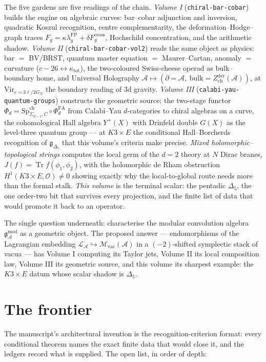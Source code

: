 \documentclass[11pt]{article}
\providecommand{\cA}{\mathcal{A}}
\providecommand{\cL}{\mathcal{L}}
\providecommand{\cM}{\mathcal{M}}
\providecommand{\cO}{\mathcal{O}}
\providecommand{\fg}{\mathfrak{g}}
\providecommand{\Vir}{\mathrm{Vir}}
\providecommand{\Zder}{Z^{\mathrm{der}}_{\mathrm{ch}}}
\providecommand{\PhiFA}{\Phi^{\mathrm{FA}}}
\providecommand{\SpCh}{\mathrm{Sp}^{\mathrm{ch}}}
\providecommand{\Dfive}{\Delta_5}
\providecommand{\Tr}{\operatorname{Tr}}
\begin{document}
The five gardens are five readings of the chain. \emph{Volume I}
(\texttt{chiral-bar-cobar}) builds the engine on algebraic curves:
bar--cobar adjunction and inversion, quadratic Koszul recognition,
centre complementarity, the deformation--Hodge--graph traces
$F_g=\kappa\lambda_g^{\mathrm{FP}}+\delta F_g^{\mathrm{cross}}$,
Hochschild concentration, and the arithmetic shadow. \emph{Volume II}
(\texttt{chiral-bar-cobar-vol2}) reads the same object as physics:
bar $=$ BV/BRST, quantum master equation $=$ Maurer--Cartan, anomaly
$=$ curvature ($c-26\leftrightarrow\kappa_{\mathrm{tot}}$), the
two-coloured Swiss-cheese operad as bulk--boundary home, and
Universal Holography $\cA\mapsto(\partial=\cA,\
\mathrm{bulk}=\Zder(\cA))$, at $\Vir_{c=3\ell/2G_N}$ the boundary
reading of 3d gravity. \emph{Volume III}
(\texttt{calabi-yau-quantum-groups}) constructs the geometric source:
the two-stage functor $\Phi_d=\SpCh_{\Sigma_{d-1},C}\circ\PhiFA_d$
from Calabi--Yau $d$-categories to chiral algebras on a curve, the
cohomological Hall algebra $Y^+(X)$ with Drinfeld double $G(X)$ as
the level-three quantum group --- at $K3\times E$ the conditional
Hall--Borcherds recognition of $\fg_{\Dfive}$ that this volume's
criteria make precise. \emph{Mixed holomorphic--topological strings}
computes the local germ of the $d=2$ theory at $N$ Dirac branes,
$J(f)=\Tr f(\phi_1,\phi_2)$, with the holomorphic de Rham obstruction
$H^1(K3\times E,\cO)\neq0$ showing exactly why the local-to-global
route needs more than the formal stalk. \emph{This volume} is the
terminal scalar: the pentadic $\Dfive$, the one order-two bit that
survives every projection, and the finite list of data that would
promote it back to an operator.

The single question underneath: characterise the modular convolution
algebra $\fg^{\mathrm{mod}}_\cA$ as a geometric object. The proposed
answer --- endomorphisms of the Lagrangian embedding
$\cL_\cA\hookrightarrow\cM_{\mathrm{vac}}(\cA)$ in a $(-2)$-shifted
symplectic stack of vacua --- has Volume I computing its Taylor jets,
Volume II its local composition law, Volume III its geometric source,
and this volume its sharpest example: the $K3\times E$ datum whose
scalar shadow is $\Dfive$.

\section{The frontier}\label{sec:frontier}

The manuscript's architectural invention is the recognition-criterion
format: every conditional theorem names the exact finite data that
would close it, and the ledgers record what is supplied. The open
list, in order of depth:
\end{document}
